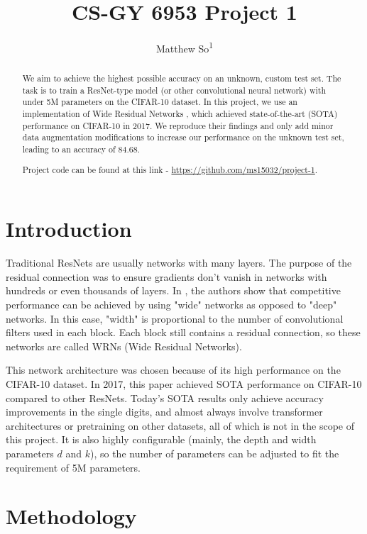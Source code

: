 \documentclass[letterpaper]{article} %
\title{CS-GY 6953 Project 1}
\author{Matthew So\textsuperscript{\rm 1}}
\begin{document}
\maketitle

\begin{abstract}
We aim to achieve the highest possible accuracy on an unknown, custom test set.  The task is to train a ResNet-type model (or other convolutional neural network) with under 5M parameters on the CIFAR-10 dataset.  In this project, we use an implementation of Wide Residual Networks \cite{zagoruyko2017wideresidualnetworks}, which achieved state-of-the-art (SOTA) performance on CIFAR-10 in 2017.  We reproduce their findings and only add minor data augmentation modifications to increase our performance on the unknown test set, leading to an accuracy of 84.68.

Project code can be found at this link - \url{https://github.com/ms15032/project-1}.
\end{abstract}

\section{Introduction}

Traditional ResNets are usually networks with many layers.  The purpose of the residual connection was to ensure gradients don't vanish in networks with hundreds or even thousands of layers.  In \cite{zagoruyko2017wideresidualnetworks}, the authors show that competitive performance can be achieved by using "wide" networks as opposed to "deep" networks.  In this case, "width" is proportional to the number of convolutional filters used in each block.  Each block still contains a residual connection, so these networks are called WRNs (Wide Residual Networks).

This network architecture was chosen because of its high performance on the CIFAR-10 dataset.  In 2017, this paper achieved SOTA performance on CIFAR-10 compared to other ResNets.  Today's SOTA results only achieve accuracy improvements in the single digits, and almost always involve transformer architectures or pretraining on other datasets, all of which is not in the scope of this project.  It is also highly configurable (mainly, the depth and width parameters $d$ and $k$), so the number of parameters can be adjusted to fit the requirement of 5M parameters.

\section{Methodology}
\end{document}
